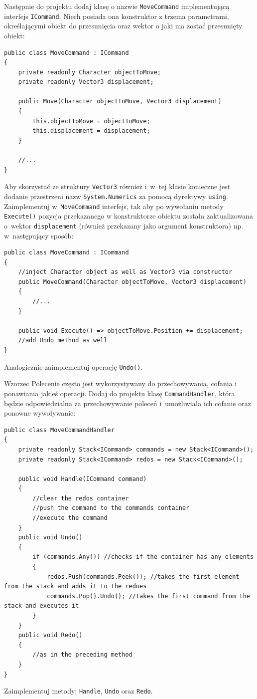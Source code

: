 Następnie do projektu dodaj klasę o nazwie \texttt{MoveCommand} implementującą interfejs \texttt{ICommand}. Niech posiada ona konstruktor z trzema parametrami, określającymi obiekt do przesunięcia oraz wektor o jaki ma zostać przesunięty obiekt:
\begin{lstlisting}
public class MoveCommand : ICommand
{
	private readonly Character objectToMove;
	private readonly Vector3 displacement;
	
	public Move(Character objectToMove, Vector3 displacement)
	{
		this.objectToMove = objectToMove;
		this.displacement = displacement;
	}

	//...
}
\end{lstlisting}
Aby skorzystać ze struktury \texttt{Vector3} również i~w~tej klasie konieczne jest dodanie przestrzeni nazw \texttt{System.Numerics} za pomocą dyrektywy \texttt{using}. Zaimplementuj w~\texttt{MoveCommand} interfejs, tak aby po wywołaniu metody \texttt{Execute()} pozycja przekazanego w konstruktorze obiektu została zaktualizowana o~wektor \texttt{displacement} (również przekazany jako argument konstruktora) np. w~następujący sposób:
\begin{lstlisting}
public class MoveCommand : ICommand
{
	//inject Character object as well as Vector3 via constructor
	public MoveCommand(Character objectToMove, Vector3 displacement)
	{
		//...
	}

	public void Execute() => objectToMove.Position += displacement;
	//add Undo method as well
}
\end{lstlisting}
Analogicznie zaimplementuj operację \texttt{Undo()}.

Wzorzec Polecenie często jest wykorzystywany do przechowywania, cofania i ponawiania jakieś operacji. Dodaj do projektu klasę \texttt{CommandHandler}, która będzie odpowiedzialna za przechowywanie poleceń i~umożliwiała ich cofanie oraz ponowne wywoływanie:
\begin{lstlisting}
public class MoveCommandHandler
{
	private readonly Stack<ICommand> commands = new Stack<ICommand>();
	private readonly Stack<ICommand> redos = new Stack<ICommand>();
	
	public void Handle(ICommand command)
	{
		//clear the redos container
		//push the command to the commands container
		//execute the command
	}
	public void Undo()
	{
		if (commands.Any()) //checks if the container has any elements
		{
			redos.Push(commands.Peek()); //takes the first element from the stack and adds it to the redoes
			commands.Pop().Undo(); //takes the first command from the stack and executes it
		}
	}
	public void Redo()
	{
		//as in the preceding method
	}
}
\end{lstlisting}
Zaimplementuj metody: \texttt{Handle}, \texttt{Undo} oraz \texttt{Redo}.

